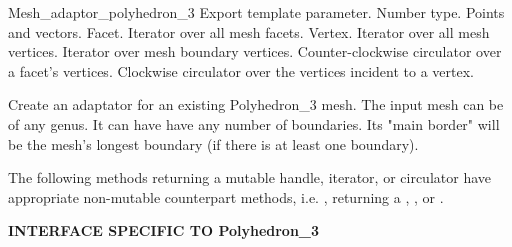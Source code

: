 \begin{ccRefClass}{Mesh_adaptor_polyhedron_3}
{
Export template parameter.
}
{
Number type.
}
{
Points and vectors.
}
{
}
{
}
{
}
{
Facet.
}
{
}
{
}
{
Iterator over all mesh facets.
}
{
}
{
Vertex.
}
{
}
{
}
{
Iterator over all mesh vertices.
}
{
}
{
Iterator over mesh boundary vertices.
}
{
}
{
Counter-clockwise circulator over a facet's vertices.
}
{
}
{
Clockwise circulator over the vertices incident to a vertex.
}
{
}


\ccCreation
{}  %

{
Create an adaptator for an existing Polyhedron\_3 mesh. The input mesh can be of any genus. It can have have any number of boundaries. Its "main border" will be the mesh's longest boundary (if there is at least one boundary).
}


\ccOperations

The following methods returning a mutable handle, iterator, or circulator have appropriate
non-mutable counterpart methods, i.e. , returning a ,
, or .

{\bf INTERFACE SPECIFIC TO Polyhedron\_3}


\end{ccRefClass}
